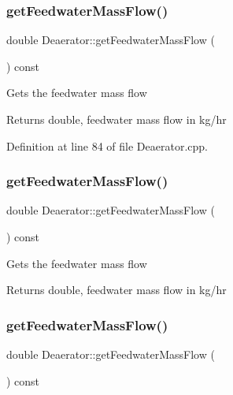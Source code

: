\subsubsection{\texorpdfstring{get\+Feedwater\+Mass\+Flow()}{getFeedwaterMassFlow()}\hspace{0.1cm}{\footnotesize\ttfamily [1/3]}}
{\footnotesize\ttfamily double Deaerator\+::get\+Feedwater\+Mass\+Flow (\begin{DoxyParamCaption}{ }\end{DoxyParamCaption}) const}

Gets the feedwater mass flow \begin{DoxyReturn}{Returns}
double, feedwater mass flow in kg/hr 
\end{DoxyReturn}


Definition at line 84 of file Deaerator.\+cpp.

\mbox{\label{class_deaerator_ae1524e8b406c3d5c2823ae4e6bafe389}} 
\subsubsection{\texorpdfstring{get\+Feedwater\+Mass\+Flow()}{getFeedwaterMassFlow()}\hspace{0.1cm}{\footnotesize\ttfamily [2/3]}}
{\footnotesize\ttfamily double Deaerator\+::get\+Feedwater\+Mass\+Flow (\begin{DoxyParamCaption}{ }\end{DoxyParamCaption}) const}

Gets the feedwater mass flow \begin{DoxyReturn}{Returns}
double, feedwater mass flow in kg/hr 
\end{DoxyReturn}
\mbox{\label{class_deaerator_ae1524e8b406c3d5c2823ae4e6bafe389}} 
\subsubsection{\texorpdfstring{get\+Feedwater\+Mass\+Flow()}{getFeedwaterMassFlow()}\hspace{0.1cm}{\footnotesize\ttfamily [3/3]}}
{\footnotesize\ttfamily double Deaerator\+::get\+Feedwater\+Mass\+Flow (\begin{DoxyParamCaption}{ }\end{DoxyParamCaption}) const}

